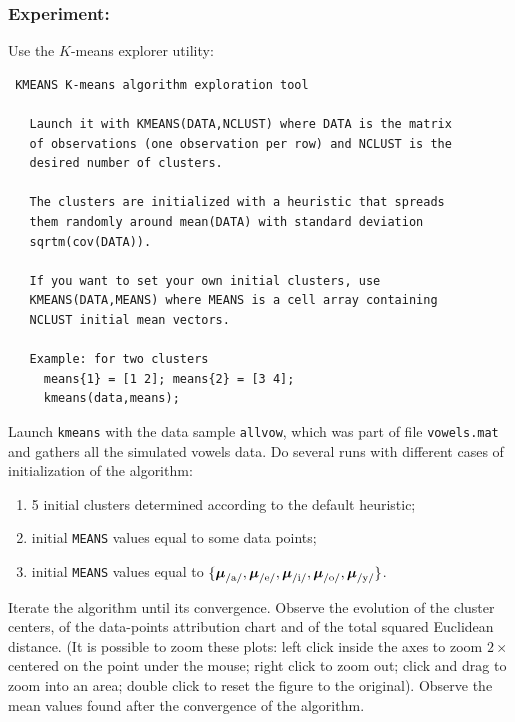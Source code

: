 \documentclass[a4paper]{article}
\newcommand{\com}[1]{{\tt #1}}
\newcommand{\muv}{\ensuremath\boldsymbol{\mu}}  %
\begin{document}


\subsubsection*{Experiment:}
Use the $K$-means explorer utility:
\begin{verbatim}
 KMEANS K-means algorithm exploration tool

   Launch it with KMEANS(DATA,NCLUST) where DATA is the matrix
   of observations (one observation per row) and NCLUST is the
   desired number of clusters.

   The clusters are initialized with a heuristic that spreads
   them randomly around mean(DATA) with standard deviation
   sqrtm(cov(DATA)).

   If you want to set your own initial clusters, use
   KMEANS(DATA,MEANS) where MEANS is a cell array containing
   NCLUST initial mean vectors.

   Example: for two clusters
     means{1} = [1 2]; means{2} = [3 4];
     kmeans(data,means);

\end{verbatim}


Launch \com{kmeans} with the data sample \com{allvow}, which was part
of file \com{vowels.mat} and gathers all the simulated vowels data. Do
several runs with different cases of initialization of the algorithm:
\begin{enumerate}
\item 5 initial clusters determined according to the default heuristic;
\item initial \com{MEANS} values equal to some data points;
\item initial \com{MEANS} values equal to $\{\muv_{\text{/a/}},
  \muv_{\text{/e/}}, \muv_{\text{/i/}}, \muv_{\text{/o/}},
  \muv_{\text{/y/}}\}$.
\end{enumerate}
Iterate the algorithm until its convergence. Observe the evolution of the
cluster centers, of the data-points attribution chart and of the total
squared Euclidean distance. (It is possible to zoom these plots: left
click inside the axes to zoom $2\times$ centered on the point under the
mouse; right click to zoom out; click and drag to zoom into an area; double
click to reset the figure to the original). %
Observe the mean values found after the convergence of the algorithm.
\end{document}

